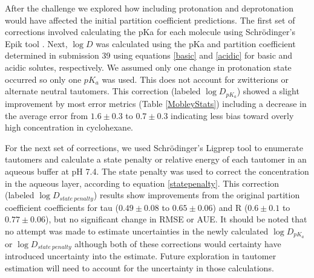 After the challenge we explored how including protonation and deprotonation would have affected the initial partition coefficient predictions. 
The first set of corrections involved calculating the pKa for each molecule using Schr\"{o}dinger's Epik tool \cite{epik,Shelley:2007ku,Greenwood:2010hh}. 
Next, $\log D$ was calculated using the pKa and partition coefficient determined in submission 39 using equations \ref{basic} and \ref{acidic} for basic and acidic solutes, respectively. 
We assumed only one change in protonation state occurred so only one $pK_a$ was used. 
This does not account for zwitterions or alternate neutral tautomers. 
This correction (labeled $\log D_{pK_a}$) showed a slight improvement by most error metrics (Table \ref{MobleyStats}) %
including a decrease in the average error from $1.6 \pm 0.3$ to $0.7 \pm 0.3$ indicating less bias toward overly high concentration in cyclohexane. 

For the next set of corrections, we used Schr\"{o}dinger's Ligprep tool \cite{ligprep} to enumerate tautomers and calculate a state penalty or relative energy of each tautomer in an aqueous buffer at pH 7.4.
The state penalty was used to correct the concentration in the aqueous layer, according to equation \ref{statepenalty}.
This correction (labeled $\log D_{state\ penalty}$) results show improvements from the original partition coefficient coefficients for tau ($0.49 \pm 0.08$ to $0.65 \pm 0.06$) and R ($0.6 \pm 0.1$ to $0.77 \pm 0.06$), but no significant change in RMSE or AUE.  
It should be noted that no attempt was made to estimate uncertainties in the newly calculated $\log D_{pK_a}$ or $\log D_{state\ penalty}$ although both of these corrections would certainty have introduced uncertainty into the estimate. 
Future exploration in tautomer estimation will need to account for the uncertainty in those calculations. 

